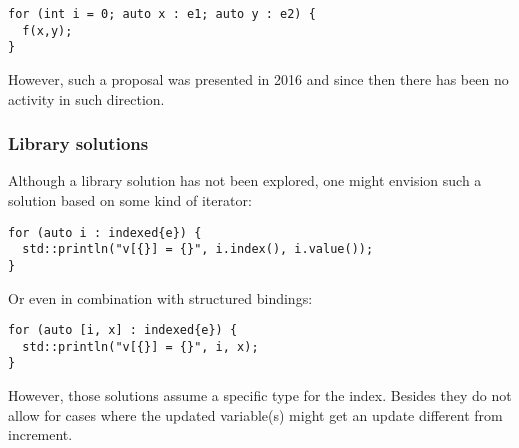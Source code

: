 \begin{lstlisting}
for (int i = 0; auto x : e1; auto y : e2) {
  f(x,y);
}
\end{lstlisting}

However, such a proposal was presented in 2016
and since then there has been no activity in such direction.

\subsubsection{Library solutions}

Although a library solution has not been explored, one might envision such a
solution based on some kind of iterator:

\begin{lstlisting}
for (auto i : indexed{e}) {
  std::println("v[{}] = {}", i.index(), i.value());
}
\end{lstlisting}

Or even in combination with structured bindings:

\begin{lstlisting}
for (auto [i, x] : indexed{e}) {
  std::println("v[{}] = {}", i, x);
}
\end{lstlisting}

However, those solutions assume a specific type for the index. Besides they do
not allow for cases where the updated variable(s) might get an update different
from increment.

